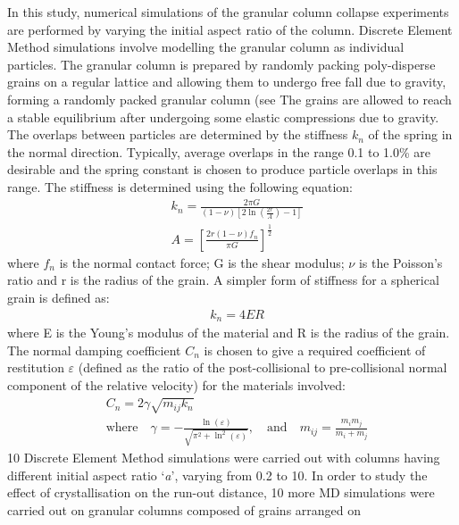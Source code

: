 In this study, numerical simulations of the granular column collapse 
experiments are performed by varying the initial aspect ratio of the column. 
Discrete Element Method simulations involve modelling the granular column as 
individual particles. The granular column is prepared by randomly packing 
poly-disperse grains on a regular lattice and allowing them to undergo free 
fall due to gravity, forming a randomly packed granular column (see  %
The grains are allowed to reach a stable equilibrium after undergoing some 
elastic compressions due to gravity. 
The overlaps between particles are determined by the stiffness 
$\textit{k}_{\textit{n}}$ of the spring in the normal direction. Typically, 
average overlaps in the range 0.1 to 1.0\% are desirable and the spring 
constant is chosen to produce particle overlaps in this range. The stiffness is 
determined using the following equation:
\begin{align}
& \textit{k}_{\textit{n}}=\frac{2 \pi G}{(1-\nu)[2\ln(\frac{2r}{A})-1]} \\ 
& A = [\frac{2r(1-\nu)f_{n}}{\pi G}]^{\frac{1	}{2}}
\end{align}
where $f_{n}$ is the normal contact force; G is the shear modulus; $\nu$ is the 
Poisson's ratio and r is the radius of the grain. A simpler form of stiffness 
for a spherical grain is defined as:
\begin{align}
& \textit{k}_{\textit{n}}=4ER
\end{align}
where E is the Young's modulus of the material and R is the radius of the 
grain. The normal damping coefficient $C_{\textit{n}}$ is chosen to give a 
required coefficient of restitution $\varepsilon$ (defined as the ratio of the 
post-collisional to pre-collisional normal component of the relative velocity) 
for the materials involved:
\begin{align}
& C_{\textit{n}}=2\gamma \sqrt{m_{\textit{ij}}k_{\textit{n}}} \\ 
& \mbox{where} \quad \gamma = -\frac{\ln(\varepsilon)}{\sqrt{\pi^{2}+\ln^2 
(\varepsilon)}},\quad \mbox{and} \quad 
\textit{m}_{\textit{ij}}=\frac{\textit{m}_{\textit{i}}\textit{m}_{\textit{j}}}{\textit{m}_{\textit{i}}
 + \textit{m}_{\textit{j}}} 
\end{align}
10 Discrete Element Method simulations were carried out with columns having 
different initial aspect ratio `\textit{a}', varying from 0.2 to 10. In order 
to study the effect of crystallisation on the run-out distance, 10 more MD 
simulations were carried out on granular columns composed of grains arranged on 
